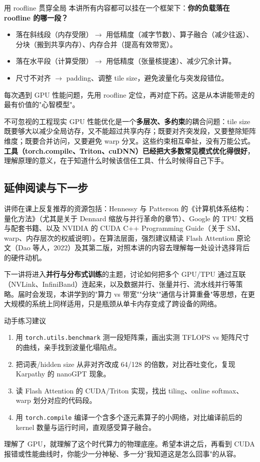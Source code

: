 \documentclass[a4paper]{article}
\begin{document}
\begin{knowledgebox}{用 roofline 贯穿全局}
本讲所有内容都可以挂在一个框架下：\textbf{你的负载落在 roofline 的哪一段？}
\begin{itemize}
\item 落在斜线段（内存受限）$\to$ 用低精度（减字节数）、算子融合（减少往返）、分块（搬到共享内存）、内存合并（提高有效带宽）。
\item 落在水平段（计算受限）$\to$ 用低精度（张量核提速）、减少冗余计算。
\item 尺寸不对齐 $\to$ padding、调整 tile size，避免波量化与突发段错位。
\end{itemize}
每次遇到 GPU 性能问题，先用 roofline 定位，再对症下药。这是从本讲能带走的最有价值的"心智模型"。
\end{knowledgebox}

\begin{warningbox}{不可忽视的工程现实}
GPU 性能优化是一个\textbf{多层次、多约束}的耦合问题：tile size 既要够大以减少全局访存，又不能超过共享内存；既要对齐突发段，又要整除矩阵维度；既要合并访问，又要避免 warp 分叉。这些约束相互牵扯，没有万能公式。\textbf{工具（torch.compile、Triton、cuDNN）已经把大多数常见模式优化得很好}，理解原理的意义，在于知道什么时候该信任工具、什么时候得自己下手。
\end{warningbox}

\subsection{延伸阅读与下一步}

讲师在课上反复推荐的资源包括：Hennessy 与 Patterson 的《计算机体系结构：量化方法》（尤其是关于 Dennard 缩放与并行革命的章节）、Google 的 TPU 文档与配套书籍、以及 NVIDIA 的 CUDA C++ Programming Guide（关于 SM、warp、内存层次的权威说明）。在算法层面，强烈建议精读 Flash Attention 原论文（Dao 等人，2022）及其第二版，对照本讲的内容去理解每一处设计选择背后的硬件动机。

下一讲将进入\textbf{并行与分布式训练}的主题，讨论如何把多个 GPU/TPU 通过互联（NVLink、InfiniBand）连起来，以及数据并行、张量并行、流水线并行等策略。届时会发现，本讲学到的"算力 vs 带宽""分块""通信与计算重叠"等思想，在更大规模的系统上同样适用，只是瓶颈从单卡内存变成了跨设备的网络。

\begin{practicebox}{动手练习建议}
\begin{enumerate}
\item 用 \texttt{torch.utils.benchmark} 测一段矩阵乘，画出实测 TFLOPS vs 矩阵尺寸的曲线，亲手找到波量化塌陷点。
\item 把词表/hidden size 从非对齐改成 64/128 的倍数，对比吞吐变化，复现 Karpathy 的 nanoGPT 现象。
\item 读 Flash Attention 的 CUDA/Triton 实现，找出 tiling、online softmax、warp 划分对应的代码段。
\item 用 \texttt{torch.compile} 编译一个含多个逐元素算子的小网络，对比编译前后的 kernel 数量与运行时间，直观感受算子融合。
\end{enumerate}
\end{practicebox}

理解了 GPU，就理解了这个时代算力的物理底座。希望本讲之后，再看到 CUDA 报错或性能曲线时，你能少一分神秘、多一分"我知道这是怎么回事"的从容。
\end{document}
